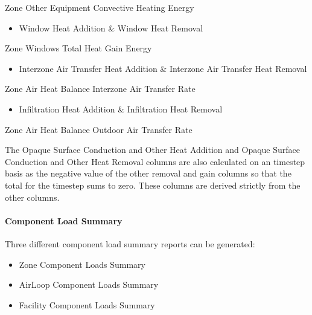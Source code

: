 Zone Other Equipment Convective Heating Energy

\begin{itemize}
\tightlist
\item
  Window Heat Addition \& Window Heat Removal
\end{itemize}

Zone Windows Total Heat Gain Energy

\begin{itemize}
\tightlist
\item
  Interzone Air Transfer Heat Addition \& Interzone Air Transfer Heat Removal
\end{itemize}

Zone Air Heat Balance Interzone Air Transfer Rate

\begin{itemize}
\tightlist
\item
  Infiltration Heat Addition \& Infiltration Heat Removal
\end{itemize}

Zone Air Heat Balance Outdoor Air Transfer Rate

The Opaque Surface Conduction and Other Heat Addition and Opaque Surface Conduction and Other Heat Removal columns are also calculated on an timestep basis as the negative value of the other removal and gain columns so that the total for the timestep sums to zero. These columns are derived strictly from the other columns.

\paragraph{Component Load Summary}\label{component-load-summary}

Three different component load summary reports can be generated: 

\begin{itemize}
\tightlist
\item
  Zone Component Loads Summary
\item
  AirLoop Component Loads Summary
\item
  Facility Component Loads Summary
\end{itemize}

